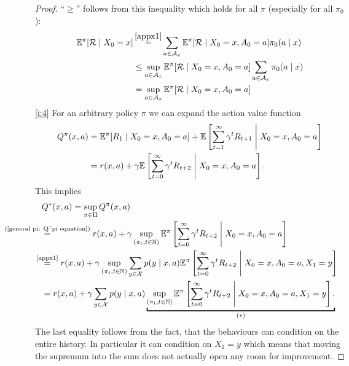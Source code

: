 \begin{proof}
	\noindent ``\(\geq\)'' follows from this inequality which holds for all \(\pi\) (especially for all \(\pi_0\)):
	\begin{align*}
		\E^\pi[\cR\mid X_0=x]
		&\xeq{\ref{appx1}}\sum_{a\in\cA_x}\E^\pi[\cR \mid X_0=x,A_0=a]\pi_0(a\mid x)\\
		&\leq \sup_{a\in\cA_x}\E^\pi[\cR \mid X_0=x, A_0=a]\sum_{a\in\cA_x}\pi_0(a\mid x)\\
		&=\sup_{a\in\cA_x}\E^\pi[\cR \mid X_0=x, A_0=a]
	\end{align*}
	\ref{i:4} For an arbitrary policy \(\pi\) we can expand the action value function
	\begin{align}
		Q^\pi(x,a)&=\mathbb{E}^\pi[R_1\mid X_0=x, A_0=a]
		+\mathbb{E}\left[\sum_{t=1}^\infty \gamma^t R_{t+1}\;\middle|\; X_0=x,A_0=a\right]
		\nonumber\\
		&=r(x,a) + \gamma \mathbb{E}\left[\sum_{t=0}^\infty \gamma^t R_{t+2}\;\middle|\; X_0=x,A_0=a\right]. \label{general pi: Q^pi equation}
	\end{align}
	This implies
	\begin{align*}
		&Q^*(x,a)=\sup_{\pi\in\Pi} Q^\pi (x,a)
		\\
		&\lxeq{\text{(\ref{general pi: Q^pi equation})}} r(x,a)
		+ \gamma \sup_{(\pi_t,t\in\N)} \E^\pi\left[\sum_{t=0}^\infty \gamma^t R_{t+2}
		\;\middle|\; X_0=x,A_0=a \right]
		\\
		&\lxeq{\text{\ref{appx1}}}r(x,a)
		+\gamma \sup_{(\pi_t,t\in\N)} \sum_{y\in\cX} p(y\mid x, a)
		\E^\pi\left[\sum_{t=0}^\infty \gamma^t R_{t+2}\;\middle|\; X_0=x,A_0=a, X_1=y \right]
		\\
		&=r(x,a)
		+\gamma \sum_{y\in\cX} p(y\mid x, a) \underbracket{
			\sup_{(\pi_t,t\in\N)}
			\E^\pi\left[\sum_{t=0}^\infty \gamma^t R_{t+2}\;\middle|\; X_0=x,A_0=a, X_1=y \right].
		}_{(*)}
	\end{align*}
	The last equality follows from the fact, that the behaviours can condition on the entire history. In particular it can condition on \(X_1=y\) which means that moving the supremum into the sum does not actually open any room for improvement. 


\end{proof}
